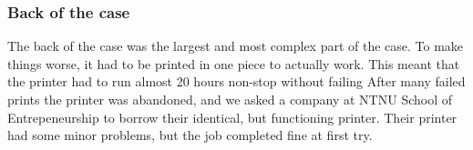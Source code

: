 \subsubsection*{Back of the case}
The back of the case was the largest and most complex part of the case.
To make things worse, it had to be printed in one piece to actually work.
This meant that the printer had to run almost 20 hours non-stop without failing
After many failed prints the printer was abandoned, and we asked a company at NTNU School of Entrepeneurship to borrow their identical, but functioning printer.
Their printer had some minor problems, but the job completed fine at first try.

